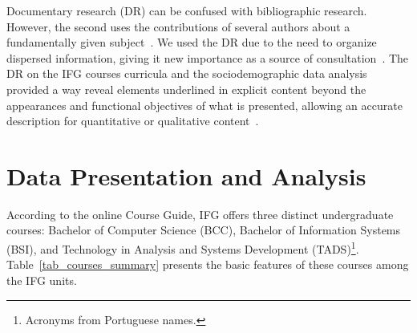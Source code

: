 \documentclass[sigconf, review]{educomp}
\begin{document}
Documentary research (DR) can be confused with bibliographic research. However, the second uses the contributions of several authors about a fundamentally given subject~\cite{gil2008metodos}.
We used the DR due to the need to organize dispersed information, giving it new importance as a source of consultation~\cite{prodanov2013metodologia}.
The DR on the IFG courses curricula and the sociodemographic data analysis provided a way reveal elements underlined in explicit content beyond the appearances and functional objectives of what is presented, allowing an accurate description for quantitative or qualitative content~\cite{bardin2011content, marconi2003fundamentos}.

\section{Data Presentation and Analysis}\label{DataPresentationandAnalysis}

According to the online Course Guide, IFG offers three distinct undergraduate courses: Bachelor of Computer Science (BCC), Bachelor of Information Systems (BSI), and Technology in Analysis and Systems Development (TADS)\footnote{Acronyms from Portuguese names.}.
Table~\ref{tab_courses_summary} presents the basic features of these courses among the IFG units.
\begin{table}[!h]
\centering
\caption{Summary of the IFG's Computer Science-related undergraduate courses.}
\label{tab_courses_summary}
\end{table}
\end{document}
